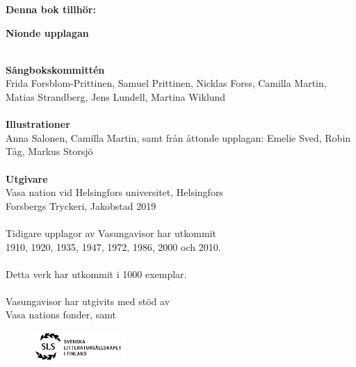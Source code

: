 
\begin{small}
\begin{center}
	\textbf{Denna bok tillhör:}
\end{center}
\end{small}
\vspace{0.5cm}
\hrulefill
\newpage
\begin{scriptsize}
\begin{center}
\textbf{Nionde upplagan}
~\\
~\\
{
\textbf{Sångbokskommittén}
~\\
Frida Forsblom-Prittinen, Samuel Prittinen, 
Nicklas Forss, Camilla Martin, Matias Strandberg,
Jens Lundell, Martina Wiklund
~\\
~\\
\textbf{Illustrationer}
~\\
Anna Salonen, Camilla Martin, samt från åttonde upplagan: Emelie Sved, Robin Tåg, Markus Storsjö
~\\
~\\
\textbf{Utgivare}
~\\
Vasa nation vid Helsingfors universitet, Helsingfors ~\\
Forsbergs Tryckeri, Jakobstad 2019
~\\
~\\
Tidigare upplagor av Vasungavisor har utkommit ~\\
1910, 1920, 1935, 1947, 1972, 1986, 2000 och 2010.
~\\
~\\
Detta verk har utkommit i 1000 exemplar.
~\\
~\\
Vasungavisor har utgivits med stöd av
~\\
Vasa nations fonder, samt
\begin{figure}[h!]
	\begin{center}
		\includegraphics[width=35mm]{SLS_logo.png}
	\end{center}
\end{figure}
}
\end{center}
\end{scriptsize}

\clearpage